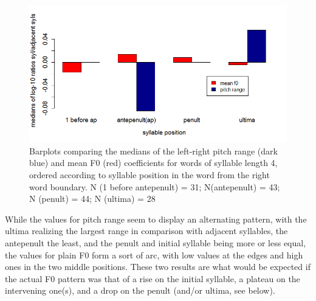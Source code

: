 \documentclass[output=paper]{LSP/langsci}
\begin{document}
\begin{figure}
\includegraphics[width=\textwidth]{figures/BUC-img4_new.png}
\caption{
Barplots comparing the medians of the left-right pitch range (dark blue) and mean F0 (red) coefficients for words of syllable length 4, ordered according to syllable position in the word from the right word boundary. N (1 before antepenult) = 31; N(antepenult) = 43; N (penult) = 44; N (ultima) = 28
}
\label{fig:buc:4}
\end{figure}



While the values for pitch range seem to display an alternating pattern, with the ultima realizing the largest range in comparison with adjacent syllables, the antepenult the least, and the penult and initial syllable being more or less equal, the values for plain F0 form a sort of arc, with low values at the edges and high ones in the two middle positions. These two results are what would be expected if the actual F0 pattern was that of a rise on the initial syllable, a plateau on the intervening one(s), and a drop on the penult (and/or ultima, see below).

\end{document}

